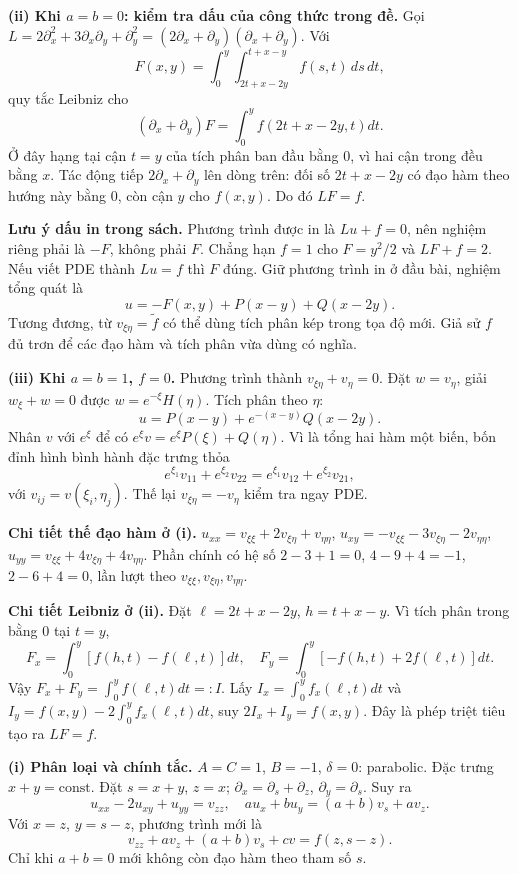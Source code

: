 \textbf{(ii) Khi $a=b=0$: kiểm tra dấu của công thức trong đề.} Gọi $L=2\partial_x^2+3\partial_x\partial_y+\partial_y^2=(2\partial_x+\partial_y)(\partial_x+\partial_y)$. Với
\[F(x,y)=\int_0^y\int_{2t+x-2y}^{t+x-y}f(s,t)\,ds\,dt,\]
quy tắc Leibniz cho
\[(\partial_x+\partial_y)F=\int_0^y f(2t+x-2y,t)dt.\]
Ở đây hạng tại cận $t=y$ của tích phân ban đầu bằng $0$, vì hai cận trong đều bằng $x$. Tác động tiếp $2\partial_x+\partial_y$ lên dòng trên: đối số $2t+x-2y$ có đạo hàm theo hướng này bằng $0$, còn cận $y$ cho $f(x,y)$. Do đó $LF=f$.

\textbf{Lưu ý dấu in trong sách.} Phương trình được in là $Lu+f=0$, nên nghiệm riêng phải là $-F$, không phải $F$. Chẳng hạn $f=1$ cho $F=y^2/2$ và $LF+f=2$. Nếu viết PDE thành $Lu=f$ thì $F$ đúng. Giữ phương trình in ở đầu bài, nghiệm tổng quát là
\[\boxed{u=-F(x,y)+P(x-y)+Q(x-2y).}\]
Tương đương, từ $v_{\xi\eta}=\widetilde f$ có thể dùng tích phân kép trong tọa độ mới. Giả sử $f$ đủ trơn để các đạo hàm và tích phân vừa dùng có nghĩa.

\textbf{(iii) Khi $a=b=1$, $f=0$.} Phương trình thành $v_{\xi\eta}+v_\eta=0$. Đặt $w=v_\eta$, giải $w_\xi+w=0$ được $w=e^{-\xi}H(\eta)$. Tích phân theo $\eta$:
\[\boxed{u=P(x-y)+e^{-(x-y)}Q(x-2y).}\]
Nhân $v$ với $e^\xi$ để có $e^\xi v=e^\xi P(\xi)+Q(\eta)$. Vì là tổng hai hàm một biến, bốn đỉnh hình bình hành đặc trưng thỏa
\[e^{\xi_1}v_{11}+e^{\xi_2}v_{22}=e^{\xi_1}v_{12}+e^{\xi_2}v_{21},\]
với $v_{ij}=v(\xi_i,\eta_j)$. Thế lại $v_{\xi\eta}=-v_\eta$ kiểm tra ngay PDE.

\textbf{Chi tiết thế đạo hàm ở (i).} $u_{xx}=v_{\xi\xi}+2v_{\xi\eta}+v_{\eta\eta}$, $u_{xy}=-v_{\xi\xi}-3v_{\xi\eta}-2v_{\eta\eta}$, $u_{yy}=v_{\xi\xi}+4v_{\xi\eta}+4v_{\eta\eta}$. Phần chính có hệ số $2-3+1=0$, $4-9+4=-1$, $2-6+4=0$, lần lượt theo $v_{\xi\xi},v_{\xi\eta},v_{\eta\eta}$.

\textbf{Chi tiết Leibniz ở (ii).} Đặt $\ell=2t+x-2y$, $h=t+x-y$. Vì tích phân trong bằng $0$ tại $t=y$,
\[F_x=\int_0^y[f(h,t)-f(\ell,t)]dt,\quad
F_y=\int_0^y[-f(h,t)+2f(\ell,t)]dt.\]
Vậy $F_x+F_y=\int_0^yf(\ell,t)dt=:I$. Lấy $I_x=\int_0^yf_x(\ell,t)dt$ và $I_y=f(x,y)-2\int_0^yf_x(\ell,t)dt$, suy $2I_x+I_y=f(x,y)$. Đây là phép triệt tiêu tạo ra $LF=f$.

\textbf{(i) Phân loại và chính tắc.} $A=C=1$, $B=-1$, $\delta=0$: parabolic. Đặc trưng $x+y=\mathrm{const}$. Đặt $s=x+y$, $z=x$; $\partial_x=\partial_s+\partial_z$, $\partial_y=\partial_s$. Suy ra
\[u_{xx}-2u_{xy}+u_{yy}=v_{zz},\quad au_x+bu_y=(a+b)v_s+av_z.\]
Với $x=z$, $y=s-z$, phương trình mới là
\[\boxed{v_{zz}+av_z+(a+b)v_s+cv=f(z,s-z).}\]
Chỉ khi $a+b=0$ mới không còn đạo hàm theo tham số $s$.

